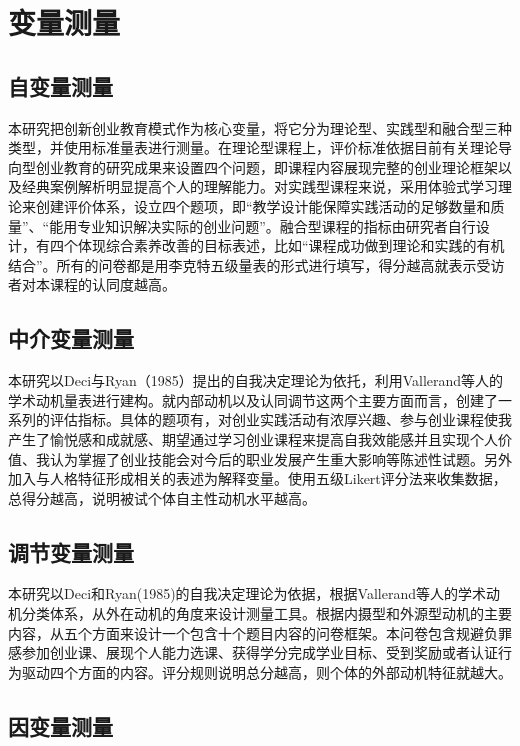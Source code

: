\section{变量测量}

\subsection{自变量测量}

本研究把创新创业教育模式作为核心变量，将它分为理论型、实践型和融合型三种类型，并使用标准量表进行测量。在理论型课程上，评价标准依据目前有关理论导向型创业教育的研究成果来设置四个问题，即课程内容展现完整的创业理论框架以及经典案例解析明显提高个人的理解能力。对实践型课程来说，采用体验式学习理论来创建评价体系，设立四个题项，即\nolinebreak[3]“教学设计能保障实践活动的足够数量和质量”、\nolinebreak[3]“能用专业知识解决实际的创业问题”。融合型课程的指标由研究者自行设计，有四个体现综合素养改善的目标表述，比如\nolinebreak[3]“课程成功做到理论和实践的有机结合”。所有的问卷都是用李克特五级量表的形式进行填写，得分越高就表示受访者对本课程的认同度越高。

\subsection{中介变量测量}

本研究以Deci与Ryan\nolinebreak[3]（1985）提出的自我决定理论为依托，利用Vallerand等人的学术动机量表进行建构\cite{Vallerand1992}。就内部动机以及认同调节这两个主要方面而言，创建了一系列的评估指标。具体的题项有，对创业实践活动有浓厚兴趣、参与创业课程使我产生了愉悦感和成就感、期望通过学习创业课程来提高自我效能感并且实现个人价值、我认为掌握了创业技能会对今后的职业发展产生重大影响等陈述性试题。另外加入与人格特征形成相关的表述为解释变量。使用五级Likert评分法来收集数据，总得分越高，说明被试个体自主性动机水平越高。

\subsection{调节变量测量}

本研究以Deci和Ryan(1985)的自我决定理论为依据，根据Vallerand等人的学术动机分类体系，从外在动机的角度来设计测量工具\cite{Vallerand1992}。根据内摄型和外源型动机的主要内容，从五个方面来设计一个包含十个题目内容的问卷框架。本问卷包含规避负罪感参加创业课、展现个人能力选课、获得学分完成学业目标、受到奖励或者认证行为驱动四个方面的内容。评分规则说明总分越高，则个体的外部动机特征就越大。

\subsection{因变量测量}


